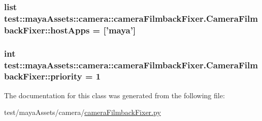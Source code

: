 \hypertarget{classtest_1_1mayaAssets_1_1camera_1_1cameraFilmbackFixer_1_1CameraFilmbackFixer_a8665d839c27bab125af06c7b12d4c866}{
\subsubsection[{host\-Apps}]{\setlength{\rightskip}{0pt plus 5cm}list {\bf test\-::maya\-Assets\-::camera\-::camera\-Filmback\-Fixer.\-Camera\-Filmback\-Fixer\-::host\-Apps} = \mbox{[}'maya'\mbox{]}}}\label{d7/d76/classtest_1_1mayaAssets_1_1camera_1_1cameraFilmbackFixer_1_1CameraFilmbackFixer_a8665d839c27bab125af06c7b12d4c866}
\hypertarget{classtest_1_1mayaAssets_1_1camera_1_1cameraFilmbackFixer_1_1CameraFilmbackFixer_a4e5fca083acb0dd3ba64ca9c83136199}{
\subsubsection[{priority}]{\setlength{\rightskip}{0pt plus 5cm}int {\bf test\-::maya\-Assets\-::camera\-::camera\-Filmback\-Fixer.\-Camera\-Filmback\-Fixer\-::priority} = 1}}\label{d7/d76/classtest_1_1mayaAssets_1_1camera_1_1cameraFilmbackFixer_1_1CameraFilmbackFixer_a4e5fca083acb0dd3ba64ca9c83136199}


\-The documentation for this class was generated from the following file\-:\begin{DoxyCompactItemize}
\item 
test/maya\-Assets/camera/\hyperlink{mayaAssets_2camera_2cameraFilmbackFixer_8py}{camera\-Filmback\-Fixer.\-py}\end{DoxyCompactItemize}
